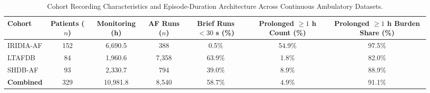 \begin{table}[t]
\centering
\caption{Cohort Recording Characteristics and Episode-Duration Architecture Across Continuous Ambulatory Datasets.}
\label{tab:cohort_architecture}
\small
\begin{tabular}{lcccccc}
\toprule
Cohort & Patients ($n$) & Monitoring (h) & AF Runs ($n$) & Brief Runs $<30$ s (\%) & Prolonged $\ge 1$ h Count (\%) & Prolonged $\ge 1$ h Burden Share (\%) \\
\midrule
IRIDIA-AF & 152 & 6,690.5 & 388 & 0.5\% & 54.9\% & 97.5\% \\
LTAFDB & 84 & 1,960.6 & 7,358 & 63.9\% & 1.8\% & 82.0\% \\
SHDB-AF & 93 & 2,330.7 & 794 & 39.0\% & 8.9\% & 88.9\% \\
\textbf{Combined} & 329 & 10,981.8 & 8,540 & 58.7\% & 4.9\% & 91.1\% \\
\bottomrule
\end{tabular}
\end{table}
